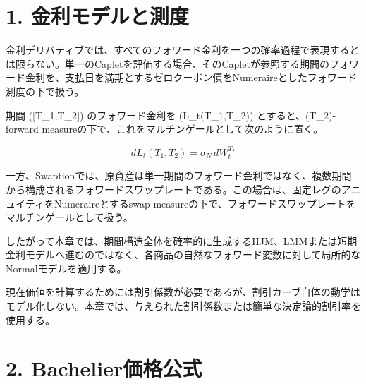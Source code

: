 \documentclass[
  letterpaper,
  DIV=11,
  numbers=noendperiod]{scrreprt}
\newenvironment{Shaded}{\begin{snugshade}}{\end{snugshade}}
\newcommand{\AttributeTok}[1]{\textcolor[rgb]{0.40,0.45,0.13}{#1}}
\newcommand{\ConstantTok}[1]{\textcolor[rgb]{0.56,0.35,0.01}{#1}}
\newcommand{\FunctionTok}[1]{\textcolor[rgb]{0.28,0.35,0.67}{#1}}
\newcommand{\NormalTok}[1]{\textcolor[rgb]{0.00,0.23,0.31}{#1}}
\newcommand{\SpecialCharTok}[1]{\textcolor[rgb]{0.37,0.37,0.37}{#1}}
\newcommand{\StringTok}[1]{\textcolor[rgb]{0.13,0.47,0.30}{#1}}
\begin{document}
\begin{Shaded}
\end{Shaded}

\section{1.
金利モデルと測度}\label{ux91d1ux5229ux30e2ux30c7ux30ebux3068ux6e2cux5ea6}

金利デリバティブでは、すべてのフォワード金利を一つの確率過程で表現するとは限らない。単一のCapletを評価する場合、そのCapletが参照する期間のフォワード金利を、支払日を満期とするゼロクーポン債をNumeraireとしたフォワード測度の下で扱う。

期間 ({[}T\_1,T\_2{]}) のフォワード金利を (L\_t(T\_1,T\_2))
とすると、(T\_2)-forward
measureの下で、これをマルチンゲールとして次のように置く。

\[
dL_t(T_1,T_2)
=
\sigma_N\,dW_t^{T_2}
\]

一方、Swaptionでは、原資産は単一期間のフォワード金利ではなく、複数期間から構成されるフォワードスワップレートである。この場合は、固定レグのアニュイティをNumeraireとするswap
measureの下で、フォワードスワップレートをマルチンゲールとして扱う。

したがって本章では、期間構造全体を確率的に生成するHJM、LMMまたは短期金利モデルへ進むのではなく、各商品の自然なフォワード変数に対して局所的なNormalモデルを適用する。

現在価値を計算するためには割引係数が必要であるが、割引カーブ自体の動学はモデル化しない。本章では、与えられた割引係数または簡単な決定論的割引率を使用する。

\section{2. Bachelier価格公式}\label{bachelierux4fa1ux683cux516cux5f0f}
\end{document}
